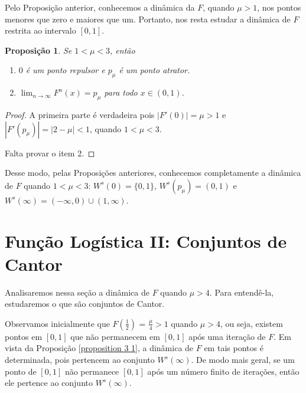 \documentclass[a4paper, 12pt]{article}
\theoremstyle{definition}
\theoremstyle{plain}
\newtheorem{proposition}[definition]{Proposição}
\theoremstyle{plain}
\theoremstyle{plain}
\theoremstyle{definition}
\theoremstyle{remark}
\begin{document}
Pelo Proposição anterior, conhecemos a dinâmica da $F$, quando $\mu > 1$, nos pontos menores que zero e maiores que um. Portanto, nos resta estudar a dinâmica de $F$ restrita ao intervalo $[0, 1]$.

\begin{proposition}
Se $1 < \mu < 3$, então
\begin{enumerate}
\item $0$ é um ponto repulsor e $p_\mu$ é um ponto atrator.
\item $\lim_{n \to \infty} F^n(x) = p_\mu$ para todo $x \in (0, 1)$.
\end{enumerate}
\end{proposition}

\begin{proof}
A primeira parte é verdadeira pois $|F'(0)| = \mu > 1$ e $|F'(p_\mu)| = |2 - \mu| < 1$, quando $1 < \mu < 3$.

Falta provar o item 2.
\end{proof}

Desse modo, pelas Proposições anteriores, conhecemos completamente a dinâmica de $F$ quando $1 < \mu < 3$: $W^s(0) = \{0, 1\}$, $W^s(p_\mu) = (0, 1)$ e $W^s(\infty) = (-\infty, 0) \cup (1, \infty)$.

\section{Função Logística II: Conjuntos de Cantor}

Analisaremos nessa seção a dinâmica de $F$ quando $\mu > 4$. Para entendê-la, estudaremos o que são conjuntos de Cantor.

Observamos inicialmente que $F(\frac{1}{2})$ = $\frac{\mu}{4} > 1$ quando $\mu > 4$, ou seja, existem pontos em $[0, 1]$ que não permanecem em $[0, 1]$ após uma iteração de $F$. Em vista da Proposição \ref{proposition 3 1}, a dinâmica de $F$ em tais pontos é determinada, pois pertencem ao conjunto $W^s(\infty)$. De modo mais geral, se um ponto de $[0, 1]$ não permanece $[0, 1]$ após um número finito de iterações, então ele pertence ao conjunto $W^s(\infty)$. 
\end{document}
